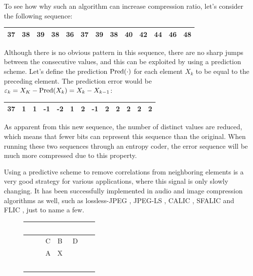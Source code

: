       To see how why such an algorithm can increase compression ratio, let's consider the following sequence:
      \begin{center}
        \begin{tabular}{|c|c|c|c|c|c|c|c|c|c|c|c|c|}
          \hline
          37 & 38 & 39 & 38 & 36 & 37 & 39 & 38 & 40 & 42 & 44 & 46 & 48 \\
          \hline
        \end{tabular}
      \end{center}
      Although there is no obvious pattern in this sequence, there are no sharp jumps between the consecutive values, and this can be exploited by using a prediction scheme. Let's define the prediction $\operatorname{Pred}(\cdot)$ for each element $X_k$ to be equal to the preceding element. The prediction error would be $\varepsilon_k = X_K - \operatorname{Pred}(X_k) = X_k - X_{k-1}$:
      \begin{center}
        \begin{tabular}{|c|c|c|c|c|c|c|c|c|c|c|c|c|}
          \hline
          37 & 1 & 1 & -1 & -2 & 1 & 2 & -1 & 2 & 2 & 2 & 2 & 2 \\
          \hline
        \end{tabular}
      \end{center}
      As apparent from this new sequence, the number of distinct values are reduced, which means that fewer bits can represent this sequence than the original. When running these two sequences through an entropy coder, the error sequence will be much more compressed due to this property.
      
      Using a predictive scheme to remove correlations from neighboring elements is a very good strategy for various applications, where this signal is only slowly changing. It has been successfully implemented in audio and image compression algorithms as well, such as lossless-JPEG \cite{pennebaker_jpeg:_1992}, JPEG-LS \cite{weinberger_loco-i_2000}, CALIC \cite{wu_context-based_1997}, SFALIC \cite{starosolski_simple_2007} and FLIC \cite{wang_fast_2012}, just to name a few.
  
      \begin{figure}
        \centering
        \renewcommand{\arraystretch}{1.5}
        \begin{tabular}{|c|c|c|c|c}
          \hline
          \rowcolor{gray!25}
          \ \ \ & \ & \ & \ \ \ & \ \\ \hline
          \rowcolor{gray!25}
          \ & C & B & D & \ \\ \hline
          \cellcolor{gray!25} \ & \cellcolor{gray!25}A & \cellcolor{green!25}X & \ & \ \\ \hline
          \ & \ & \ & \ & \ \\
        \end{tabular}
        \label{fig:context}
      \end{figure}

